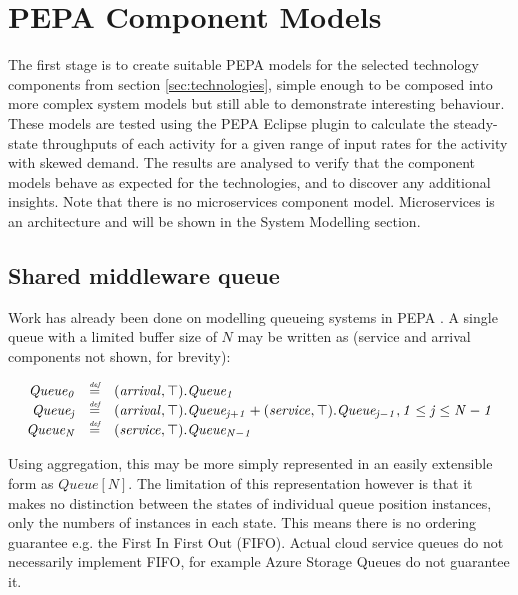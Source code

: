 %
%

\section{PEPA Component Models}\label{sec:pepa-component-models}

The first stage is to create suitable PEPA models for the selected technology components from section \ref{sec:technologies}, simple enough to be composed into more complex system models but still able to demonstrate interesting behaviour.  These models are tested using the PEPA Eclipse plugin \cite{RN1080} to calculate the steady-state throughputs of each activity for a given range of input rates for the activity with skewed demand.  The results are analysed to verify that the component models behave as expected for the technologies, and to discover any additional insights.  Note that there is no microservices component model.  Microservices is an architecture and will be shown in the System Modelling section.

%
%
\FloatBarrier
\subsection{Shared middleware queue}

Work has already been done on modelling queueing systems in PEPA \cite{RN75}.  A single queue with a limited buffer size of $\mathit{N}$ may be written as (service and arrival components not shown, for brevity):

\begin{displaymath}
\centering
\begin{array}{rcl}
\mathit{Queue_0} & \rmdef & (\mathit{arrival},\mathit{\top}).\mathit{Queue_1}\\
\mathit{Queue_j} & \rmdef & (\mathit{arrival},\mathit{\top}).\mathit{Queue_{j+1}} + (\mathit{service},\mathit{\top}).\mathit{Queue_{j-1}}, \mathit{1 \le j \le N-1}\\
\mathit{Queue_N} & \rmdef & (\mathit{service},\mathit{\top}).\mathit{Queue_{N-1}}\\
\end{array}
\end{displaymath}

Using aggregation, this may be more simply represented in an easily extensible form as $\mathit{Queue[N]}$.  The limitation of this representation however is that it makes no distinction between the states of individual queue position instances, only the numbers of instances in each state.  This means there is no ordering guarantee e.g. the First In First Out (FIFO).  Actual cloud service queues do not necessarily implement FIFO, for example Azure Storage Queues \cite{RN1072} do not guarantee it.

